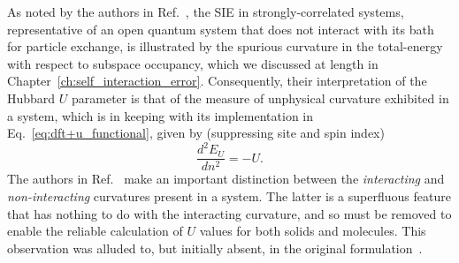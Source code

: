 As noted by the authors in Ref.~\cite{PhysRevB.71.035105}, 
the SIE in strongly-correlated systems, 
representative of an open quantum system
 that does not interact with its bath for particle exchange, 
is illustrated by the spurious curvature 
in the total-energy  
with respect to subspace occupancy, 
which we discussed at length in Chapter~\ref{ch:self_interaction_error}.
%
Consequently, 
their interpretation of the Hubbard $U$ parameter 
is that of the measure of unphysical curvature exhibited in a system, 
which is in keeping with its implementation 
in Eq.~\eqref{eq:dft+u_functional}, 
given by (suppressing site and spin index)
%
\begin{equation}
\frac{d^2E_U}{dn^2}=-U.
\end{equation}
%
The authors in Ref.~\cite{PhysRevB.71.035105} 
make an important distinction 
between the {\it interacting} and {\it non-interacting} curvatures 
present in a system.
%
{
The latter is a superfluous feature 
that has nothing to do with the interacting curvature, 
and so must be removed  
to enable the reliable calculation of  $U$ values 
for both solids and molecules.}
%
{
This observation was alluded to, 
but initially absent, 
in the original formulation~\cite{PhysRevB.58.1201}.}

